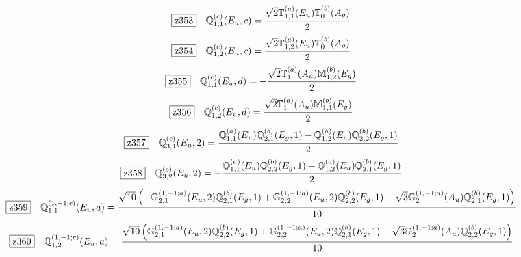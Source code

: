 \documentclass[fleqn,10pt,landscape]{jsarticle}
\begin{document}
\begin{dmath*}
\hspace*{3mm}\fbox{z353}\quad \mathbb{Q}_{1,1}^{(c)}(E_{u},c)=\frac{\sqrt{2} \mathbb{T}_{1,1}^{(a)}(E_{u}) \mathbb{T}_{0}^{(b)}(A_{g})}{2}
\end{dmath*}
\begin{dmath*}
\hspace*{3mm}\fbox{z354}\quad \mathbb{Q}_{1,2}^{(c)}(E_{u},c)=\frac{\sqrt{2} \mathbb{T}_{1,2}^{(a)}(E_{u}) \mathbb{T}_{0}^{(b)}(A_{g})}{2}
\end{dmath*}
\begin{dmath*}
\hspace*{3mm}\fbox{z355}\quad \mathbb{Q}_{1,1}^{(c)}(E_{u},d)=- \frac{\sqrt{2} \mathbb{T}_{1}^{(a)}(A_{u}) \mathbb{M}_{1,2}^{(b)}(E_{g})}{2}
\end{dmath*}
\begin{dmath*}
\hspace*{3mm}\fbox{z356}\quad \mathbb{Q}_{1,2}^{(c)}(E_{u},d)=\frac{\sqrt{2} \mathbb{T}_{1}^{(a)}(A_{u}) \mathbb{M}_{1,1}^{(b)}(E_{g})}{2}
\end{dmath*}
\begin{dmath*}
\hspace*{3mm}\fbox{z357}\quad \mathbb{Q}_{3,1}^{(c)}(E_{u},2)=\frac{\mathbb{Q}_{1,1}^{(a)}(E_{u}) \mathbb{Q}_{2,1}^{(b)}(E_{g},1) - \mathbb{Q}_{1,2}^{(a)}(E_{u}) \mathbb{Q}_{2,2}^{(b)}(E_{g},1)}{2}
\end{dmath*}
\begin{dmath*}
\hspace*{3mm}\fbox{z358}\quad \mathbb{Q}_{3,2}^{(c)}(E_{u},2)=- \frac{\mathbb{Q}_{1,1}^{(a)}(E_{u}) \mathbb{Q}_{2,2}^{(b)}(E_{g},1) + \mathbb{Q}_{1,2}^{(a)}(E_{u}) \mathbb{Q}_{2,1}^{(b)}(E_{g},1)}{2}
\end{dmath*}
\begin{dmath*}
\hspace*{3mm}\fbox{z359}\quad \mathbb{Q}_{1,1}^{(1,-1;c)}(E_{u},a)=\frac{\sqrt{10} \left(- \mathbb{G}_{2,1}^{(1,-1;a)}(E_{u},2) \mathbb{Q}_{2,1}^{(b)}(E_{g},1) + \mathbb{G}_{2,2}^{(1,-1;a)}(E_{u},2) \mathbb{Q}_{2,2}^{(b)}(E_{g},1) - \sqrt{3} \mathbb{G}_{2}^{(1,-1;a)}(A_{u}) \mathbb{Q}_{2,1}^{(b)}(E_{g},1)\right)}{10}
\end{dmath*}
\begin{dmath*}
\hspace*{3mm}\fbox{z360}\quad \mathbb{Q}_{1,2}^{(1,-1;c)}(E_{u},a)=\frac{\sqrt{10} \left(\mathbb{G}_{2,1}^{(1,-1;a)}(E_{u},2) \mathbb{Q}_{2,2}^{(b)}(E_{g},1) + \mathbb{G}_{2,2}^{(1,-1;a)}(E_{u},2) \mathbb{Q}_{2,1}^{(b)}(E_{g},1) - \sqrt{3} \mathbb{G}_{2}^{(1,-1;a)}(A_{u}) \mathbb{Q}_{2,2}^{(b)}(E_{g},1)\right)}{10}
\end{dmath*}
\end{document}
